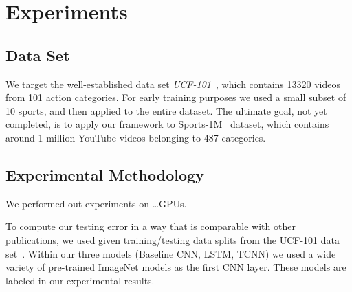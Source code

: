 \section{Experiments}
\subsection{Data Set}
We target the well-established data set \emph{UCF-101}~\cite{ucf101}, which contains 13320 videos from 101 action categories. For early training purposes we used a small subset of 10 sports, and then applied to the entire dataset. The ultimate goal, not yet completed, is to apply our framework to Sports-1M~\cite{cnnvid} dataset, which contains around 1 million YouTube videos belonging to 487 categories.

\subsection{Experimental Methodology}
We performed out experiments on \dots GPUs.

To compute our testing error in a way that is comparable with other publications, we used given training/testing data splits from the UCF-101 data set~\cite{ucf101}. Within our three models (Baseline CNN, LSTM, TCNN) we used a wide variety of pre-trained ImageNet models as the first CNN layer. These models are labeled in our experimental results. 



